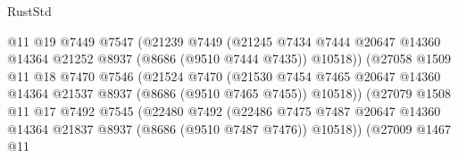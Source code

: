\begin{lexlean}{RustStd}
\begin{coremodule}
                                    @11
                                    @19
                                    @7449
                                    @7547
                                    (@21239
                                      @7449
                                      (@21245
                                        @7434
                                        @7444
                                        @20647
                                        @14360
                                        @14364
                                        @21252
                                        @8937
                                        (@8686 (@9510 @7444 @7435))
                                        @10518))
                                    (@27058
                                      @1509
                                      @11
                                      @18
                                      @7470
                                      @7546
                                      (@21524
                                        @7470
                                        (@21530
                                          @7454
                                          @7465
                                          @20647
                                          @14360
                                          @14364
                                          @21537
                                          @8937
                                          (@8686 (@9510 @7465 @7455))
                                          @10518))
                                      (@27079
                                        @1508
                                        @11
                                        @17
                                        @7492
                                        @7545
                                        (@22480
                                          @7492
                                          (@22486
                                            @7475
                                            @7487
                                            @20647
                                            @14360
                                            @14364
                                            @21837
                                            @8937
                                            (@8686 (@9510 @7487 @7476))
                                            @10518))
                                        (@27009
                                          @1467
                                          @11

\end{coremodule}
\end{lexlean}
